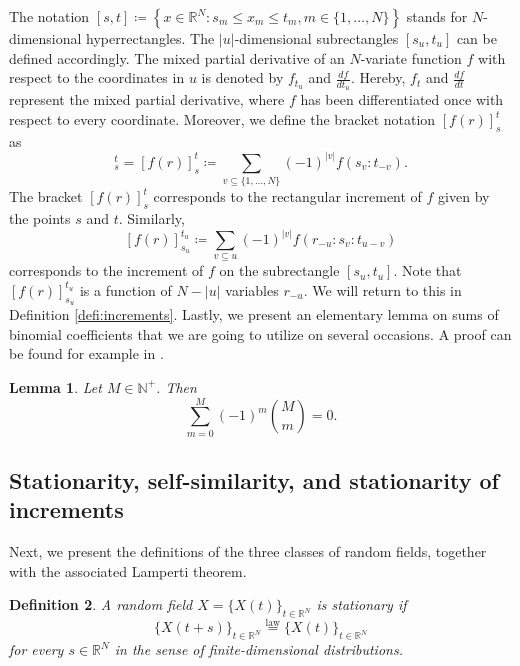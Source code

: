 \documentclass[english, a4paper, 12pt,reqno]{amsart}
\newtheorem{defi}{Definition}[section]
\newtheorem{lemma}[defi]{Lemma}
\begin{document}
The notation $[s,t] \coloneqq \left\{x\in\mathbb{R}^N : s_m \leq x_m \leq t_m, m \in \{1,\dots,N\}\right\}$ stands for $N$-dimensional hyperrectangles. The $|u|$-dimensional subrectangles $[s_u,t_u]$ can be defined accordingly. The mixed partial derivative of an $N$-variate function $f$ with respect to the coordinates in $u$ is denoted by $f_{t_u}$ and $\frac{df}{dt_u}$. Hereby, $f_t$ and $\frac{df}{dt}$ represent the mixed partial derivative, where $f$ has been differentiated once with respect to every coordinate. Moreover, we define the bracket notation $[f(r)]_s^t$ as
\begin{equation*}
 [f]_s^t= \left[f(r)\right]_s^t \coloneqq \sum_{v\subseteq\{1,\dots,N\}} (-1)^{|v|} f(s_v:t_{-v}). 
\end{equation*}
The bracket $\left[f(r)\right]_s^t$ corresponds to the rectangular increment of $f$ given by the points $s$ and $t$. Similarly, 
\begin{equation*}
\left[f(r)\right]_{s_u}^{t_u}\coloneqq \sum_{v\subseteq u} (-1)^{|v|} f(r_{-u}:s_v:t_{u-v})
\end{equation*}
corresponds to the increment of $f$ on the subrectangle $[s_u,t_u]$. Note that $\left[f(r)\right]_{s_u}^{t_u}$ is a function of $N - |u|$ variables $r_{-u}$.
We will return to this in Definition \ref{defi:increments}. Lastly, we present an elementary lemma on sums of binomial coefficients that we are going to utilize on several occasions. A proof can be found for example in \cite{discrete}.

\begin{lemma}
\label{binomial}
Let $M\in\mathbb{N}^+$. Then
\begin{equation*}
\sum_{m=0}^M (-1)^m\binom{M}{m} = 0.
\end{equation*}
\end{lemma}


\subsection{Stationarity, self-similarity, and stationarity of increments}
Next, we present the definitions of the three classes of random fields, together with the associated Lamperti theorem.
\begin{defi}
\label{defi:stationarity}
A random field $X = \{X(t)\}_{t\in\mathbb{R}^N}$ is stationary if 
$$ \{X(t+s)\}_{t\in\mathbb{R}^N} \overset{\text{law}}{=} \{X(t)\}_{t\in\mathbb{R}^N}$$
for every $s\in\mathbb{R}^N$ in the sense of finite-dimensional distributions.
\end{defi}
\end{document}
